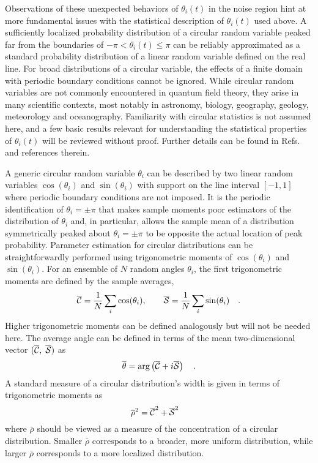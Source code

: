 Observations of these unexpected behaviors of $\theta_i(t)$ in the noise region hint at more fundamental issues with the 
statistical description of $\theta_i(t)$ used above. A sufficiently localized probability distribution of a circular random variable 
peaked far from the boundaries of $-\pi <\theta_i(t) \leq \pi$ can be reliably approximated as a standard probability distribution 
of a linear random variable defined on the real line. For broad distributions of a circular variable, the effects of a finite domain 
with periodic boundary conditions cannot be ignored. While circular random variables are not commonly encountered in 
quantum field theory, they arise in many scientific contexts, 
most notably in astronomy, biology, geography, geology, meteorology and oceanography. 
Familiarity with circular statistics is not assumed here, and a few basic results relevant for understanding the statistical 
properties of $\theta_i(t)$ will be reviewed  without proof. Further details can be found in 
Refs.~\cite{Fisher:1995,Mardia:2009,Borradaile:2003} and references therein.



A generic circular random variable $\theta_i$ can be described by two linear random variables $\cos(\theta_i)$ and $\sin(\theta_i)$ 
with support on the line interval $[-1, 1]$ where periodic boundary conditions are not imposed. 
It is the periodic identification of $\theta_i = \pm \pi$ that makes sample moments poor estimators of the distribution of $\theta_i$ and,
 in particular, allows the sample mean of a distribution symmetrically peaked about $\theta_i = \pm \pi$ to be 
 opposite the actual location of peak probability. Parameter estimation for circular distributions can be straightforwardly 
 performed using trigonometric moments of $\cos(\theta_i)$ and $\sin(\theta_i)$. 
 For an ensemble of $N$ random angles $\theta_i$, the first trigonometric moments are defined by the sample averages,
\begin{equation}
  \bar{\cal C} = \frac{1}{N}\sum_i \cos(\theta_i), \hspace{20pt} \bar{\cal S} = \frac{1}{N}\sum_i \sin(\theta_i)
  \ \ \ .
  \label{trigmeandef}
\end{equation}
%
Higher trigonometric moments can be defined analogously but will not be needed here. 
The average angle can be defined in terms of the mean two-dimensional vector $(\bar{\cal C},\;\bar{\cal S})$ as
%
\begin{equation}
  \bar{\theta} = \text{arg}\left( \bar{\cal C} + i \bar{\cal S} \right)
  \ \ \  .
  \label{thetabardef}
\end{equation}
%
A standard measure of a circular distribution's width is given in terms of trigonometric moments as
\begin{equation}
  \bar{\rho}^2 = \bar{\cal C}^2 + \bar{\cal S}^2
  \ \ \ 
  \label{Rdef}
\end{equation}
% 
where $\bar{\rho}$ should be viewed as a measure of the concentration of a circular distribution. 
Smaller $\bar{\rho}$ corresponds to a broader, more uniform distribution, while larger $\bar{\rho}$ corresponds to a more localized distribution. 





